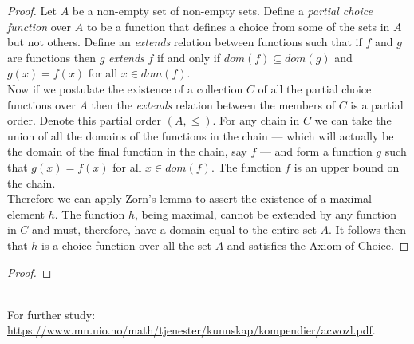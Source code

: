 \documentclass[MathsNotesBase.tex]{subfiles}
\begin{document}
{		
		\begin{proof}
			Let $A$ be a non-empty set of non-empty sets. Define a \textit{partial choice function} over $A$ to be a function that defines a choice from some of the sets in $A$ but not others. Define an \textit{extends} relation between functions such that if $f$ and $g$ are functions then $g$ \textit{extends} $f$ if and only if ${ dom(f) \subseteq dom(g) }$ and ${ g(x) = f(x) }$ for all ${ x \in dom(f). }$\\
			Now if we postulate the existence of a collection $C$ of all the partial choice functions over $A$ then the \textit{extends} relation between the members of $C$ is a partial order. Denote this partial order ${ (A, \leq) }$.
			For any chain in $C$ we can take the union of all the domains of the functions in the chain --- which will actually be the domain of the final function in the chain, say $f$ --- and form a function $g$ such that ${ g(x) = f(x) }$ for all ${ x \in dom(f) }$. The function $f$ is an upper bound on the chain.\\
			Therefore we can apply Zorn's lemma to assert the existence of a maximal element $h$. The function $h$, being maximal, cannot be extended by any function in $C$ and must, therefore, have a domain equal to the entire set $A$. It follows then that $h$ is a choice function over all the set $A$ and satisfies the Axiom of Choice.
		\end{proof}
	
		\bigskip
		\begin{proof}
		\end{proof}
	
		\bigskip
		
	
		
		\bigskip
		\\
		
		For further study: \url{https://www.mn.uio.no/math/tjenester/kunnskap/kompendier/acwozl.pdf}.
	}
	
\end{document}
